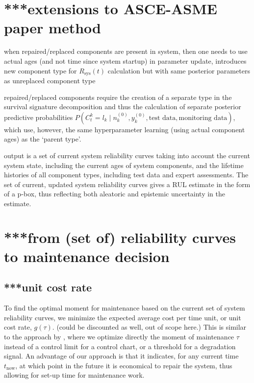 \documentclass[authoryear]{elsarticle}
\newcommand{\uz}{^{(0)}} %
\newcommand{\Rsys}{R_\text{sys}}
\def\ykz{y\uz_k}
\def\nkz{n\uz_k}
\def\tnow{t_\text{now}}
\begin{document}
\section{***extensions to ASCE-ASME paper method}
\label{sec:extensions}

when repaired/replaced components are present in system,
then one needs to use actual ages (and not time since system startup) in parameter update,
introduces new component type for $\Rsys(t)$ calculation but with same posterior parameters as unreplaced component type

repaired/replaced components require the creation of a separate type in the survival signature decomposition
and thus the calculation of separate posterior predictive probabilities
$P(C^k_t = l_k \mid \nkz,\ykz,\text{test data},\text{monitoring data})$,
which use, however, the same hyperparameter learning (using actual component ages) as the `parent type'.

output is a set of current system reliability curves
taking into account the current system state,
including the current ages of system components, 
and the lifetime histories of all component types,
including test data and expert assessments.
The set of current, updated system reliability curves gives a RUL estimate
in the form of a p-box, thus reflecting both aleatoric and epistemic uncertainty in the estimate.


\section{***from (set of) reliability curves to maintenance decision}

\subsection{***unit cost rate}

To find the optimal moment for maintenance based on the current set of system reliability curves,
we minimize the expected average cost per time unit,
or unit cost rate, $g(\tau)$. (could be discounted as well, out of scope here.)
This is similar to the approach by \cite{2011:kim-et-al},
where we optimize directly the moment of maintenance $\tau$
instead of a control limit for a control chart, or a threshold for a degradation signal.
An advantage of our approach is that
it indicates, for any current time $\tnow$, at which point in the future it is economical to repair the system,
thus allowing for set-up time for maintenance work.
\end{document}
